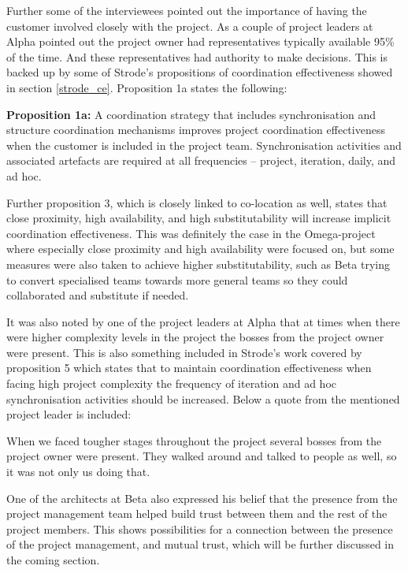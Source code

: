 Further some of the interviewees pointed out the importance of having the customer involved closely with the project. As a couple of project leaders at Alpha pointed out the project owner had representatives typically available 95\% of the time. And these representatives had authority to make decisions. This is backed up by some of Strode's \cite{Strode2012} propositions of coordination effectiveness showed in section \ref{strode_ce}. Proposition 1a states the following:

\begin{fancyquotes}
\textbf{Proposition 1a:} A coordination strategy that includes synchronisation and structure coordination mechanisms improves project coordination effectiveness when the customer is included in the project team. Synchronisation activities and associated artefacts are required at all frequencies – project, iteration, daily, and ad hoc.
\end{fancyquotes}

Further proposition 3, which is closely linked to co-location as well, states that close proximity, high availability, and high substitutability will increase implicit coordination effectiveness. This was definitely the case in the Omega-project where especially close proximity and high availability were focused on, but some measures were also taken to achieve higher substitutability, such as Beta trying to convert specialised teams towards more general teams so they could collaborated and substitute if needed.

It was also noted by one of the project leaders at Alpha that at times when there were higher complexity levels in the project the bosses from the project owner were present. This is also something included in Strode's work covered by proposition 5 which states that to maintain coordination effectiveness when facing high project complexity the frequency of iteration and ad hoc synchronisation activities should be increased. Below a quote from the mentioned project leader is included:

\begin{fancyquotes}
When we faced tougher stages throughout the project several bosses from the project owner were present. They walked around and talked to people as well, so it was not only us doing that.
\end{fancyquotes}

One of the architects at Beta also expressed his belief that the presence from the project management team helped build trust between them and the rest of the project members. This shows possibilities for a connection between the presence of the project management, and mutual trust, which will be further discussed in the coming section.

